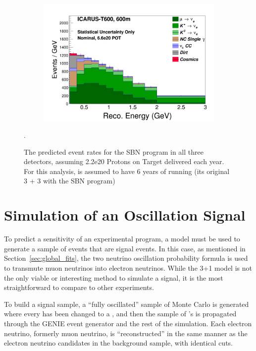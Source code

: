 \begin{figure}[htbp]
\begin{subfigure}[]{0.49\textwidth}
        \includegraphics[width=\textwidth]{sbn_figures/nominal_nue_appearance_nosig_ICARUS-T600_600m}
    \end{subfigure}
    \caption[SBN Event Rates]{The predicted event rates for the SBN program in all three detectors, assuming 2.2e20 Protons on Target delivered each year.  For this analysis, \uboone is assumed to have 6 years of running (its original 3 + 3 with the SBN program)}.
   \label{fig:sbn_event_rates_no_signal}
\end{figure}

\section{Simulation of an Oscillation Signal}

To predict a sensitivity of an experimental program, a model must be used to generate a sample of events that are signal events.  In this case, as mentioned in Section~\ref{sec:global_fits}, the two neutrino oscillation probability formula is used to transmute muon neutrinos into electron neutrinos.  While the 3+1 model is not the only viable or interesting method to simulate a signal, it is the most straightforward to compare to other experiments.  

To build a signal sample, a ``fully oscillated'' sample of Monte Carlo is generated where every \numu has been changed to a \nue, and then the sample of \nue's is propagated through the GENIE event generator and the rest of the simulation.  Each electron neutrino, formerly muon neutrino, is ``reconstructed'' in the same manner as the electron neutrino candidates in the background sample, with identical cuts.  

